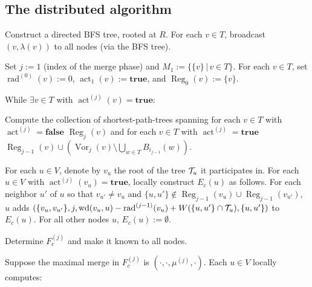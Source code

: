 \documentclass[letterpaper,11pt]{article}
\newcommand{\M}{\mathcal{M}}
\newcommand{\Comp}{\lambda}
\DeclareMathOperator{\act}{act}
\DeclareMathOperator{\moat}{rad}
\DeclareMathOperator{\Wd}{wd}
\DeclareMathOperator{\reg}{Reg}
\DeclareMathOperator{\vor}{Vor}
\newcommand{\true}{\mathbf{true}}
\newcommand{\false}{\mathbf{false}}
\begin{document}
\subsection{The distributed algorithm}
\label{app-distalg}
\begin{compactenum}
\item Construct a directed BFS tree, rooted at $R$. For each $v\in T$, broadcast
$(v,\Comp(v))$ to all nodes (via the BFS tree).
\item Set $j:=1$ (index of the merge phase) and $M_1:=\{\{v\}\,|\,v\in T\}$. For
each $v\in T$, set $\moat^{(0)}(v):=0$, $\act_1(v):=\true$, and
$\reg_0(v):=\{v\}$.
\item While $\exists v\in T$ with $\act^{(j)}(v)=\true$:
\begin{compactenum}
\item Compute the collection of shortest-path-trees spanning for each $v\in T$
with $\act^{(j)}=\false$ $\reg_j(v)$ and for each $v\in T$ with $\act^{(j)}=\true$
$\reg_{j-1}(v)\cup (\vor_j(v)\setminus \bigcup_{w\in T}B_{i_{j-1}}(w))$.
\item For each $u\in V$, denote by $v_u$ the root of the tree ${\cal T}_u$ it
participates in. For each $u\in V$ with $\act^{(j)}(v_u)=\true$, locally construct
$E_c(u)$ as follows. For each neighbor $u'$ of $u$ so that $v_{u'}\neq v_u$ and
$\{u,u'\}\notin \reg_{j-1}(v_u)\cup \reg_{j-1}(v_{u'})$, $u$
adds $(\{v_u,v_{u'}\},j,\Wd(v_u,u)-\moat^{(j-1)}(v_u)+W(\{u,u'\}\cap
{\cal T}_u),\{u,u'\})$ to $E_c(u)$. For all other nodes $u$,
$E_c(u):=\emptyset$.
\item Determine $F_c^{(j)}$ and make it known to all nodes.
\item Suppose the maximal merge in $F_c^{(j)}$ is
$(\cdot,\cdot,\mu^{(j)},\cdot)$. Each $u\in V$ locally computes:
\end{compactenum}
\end{compactenum}
\end{document}
